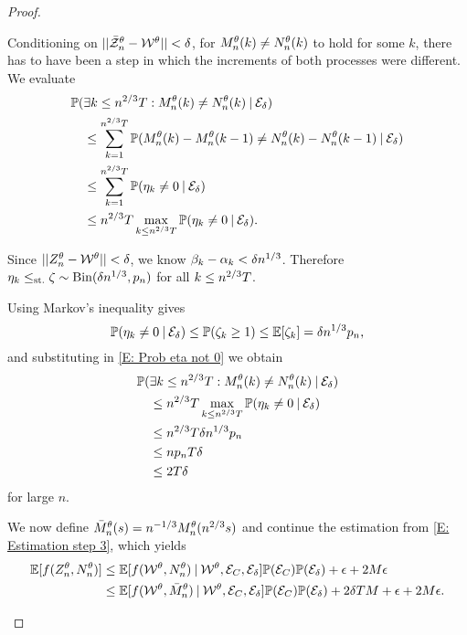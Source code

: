 \begin{proof}
\begin{proofpart}
Conditioning on $||\bar{\mathcal{Z}}^{\theta}_n - \mathcal{W}^{\theta}|| < \delta$, for $M_n^{\theta}(k) \neq N_n^{\theta}(k)$ to hold for some $k$,
there has to have been a step in which the increments of both processes were different.
We evaluate
\begin{equation} \label{E: Prob eta not 0}
\begin{aligned}
&\mathbb{P}(\exists k\leq n^{2 / 3}T: M_n^{\theta}(k) \neq N_n^{\theta}(k) \: | \: \mathcal{E}_{\delta}) \\
&\quad \leq \sum_{k=1}^{n^{2 / 3}T} \mathbb{P}( M_n^{\theta}(k) - M_n^{\theta}(k-1) \neq N_n^{\theta}(k) - N_n^{\theta}(k-1) \: | \: \mathcal{E}_{\delta}) \\
&\quad \leq \sum_{k=1}^{n^{2 / 3}T} \mathbb{P}( \eta_k \neq 0 \: | \: \mathcal{E}_{\delta}) \\
&\quad \leq n^{2 / 3}T \max_{k \leq n^{2 / 3}T} \mathbb{P}(\eta_k \neq 0 \: | \: \mathcal{E}_{\delta}).
\end{aligned}
\end{equation}

Since $||Z_n^{\theta} - \mathcal{W}^{\theta}|| < \delta$, we know $\beta_k - \alpha_k < \delta n^{1 / 3}$. Therefore
$\eta_k \leq_{\text{st.}} \zeta \sim \operatorname*{Bin}(\delta n^{1 / 3}, p_n)$ for all $k \leq n^{2 / 3}T$.

Using Markov's inequality gives
\begin{equation}
\mathbb{P}( \eta_k \neq 0 \: | \: \mathcal{E}_{\delta} ) \leq \mathbb{P}( \zeta_k \geq 1 ) \leq \mathbb{E}[\zeta_k] = \delta n^{1 / 3}p_n,
\end{equation}
and substituting in \eqref{E: Prob eta not 0} we obtain
\begin{equation}
\begin{aligned}
&\mathbb{P}(\exists k\leq n^{2 / 3}T: M_n^{\theta}(k) \neq N_n^{\theta}(k) \: | \: \mathcal{E}_{\delta}) \\
&\quad \leq n^{2 / 3}T \max_{k \leq n^{2 / 3}T} \mathbb{P}( \eta_k \neq 0 \: | \: \mathcal{E}_{\delta} ) \\
&\quad \leq n^{2 / 3}T\delta n^{1 / 3}p_n \\
&\quad \leq n p_n T \delta \\
&\quad \leq 2T\delta 
\end{aligned}
\end{equation}
for large $n$.

We now define $\bar{M}_n^{\theta}(s) = n^{-1 / 3} M_n^{\theta}(n^{2 / 3}s)$ and continue the estimation from \eqref{E: Estimation step 3},
which yields
\begin{equation} \label{E: Estimation step 4}
\begin{aligned}
\mathbb{E}[f(Z_n^{\theta}, N_n^{\theta})] 
&\leq \mathbb{E}[f(\mathcal{W}^{\theta}, N_n^{\theta}) \: | \: \mathcal{W}^{\theta}, \mathcal{E}_{C}, \mathcal{E}_{\delta}]\mathbb{P}(\mathcal{E}_{C})\mathbb{P}(\mathcal{E}_{\delta}) + \epsilon + 2M\epsilon   \\
&\leq \mathbb{E}[f(\mathcal{W}^{\theta}, \bar{M}_n^{\theta}) \: | \: \mathcal{W}^{\theta}, \mathcal{E}_{C}, \mathcal{E}_{\delta}]\mathbb{P}(\mathcal{E}_{C})\mathbb{P}(\mathcal{E}_{\delta}) + 2\delta T M + \epsilon  + 2M\epsilon  .
\end{aligned}
\end{equation}


\end{proofpart}
\end{proof}
